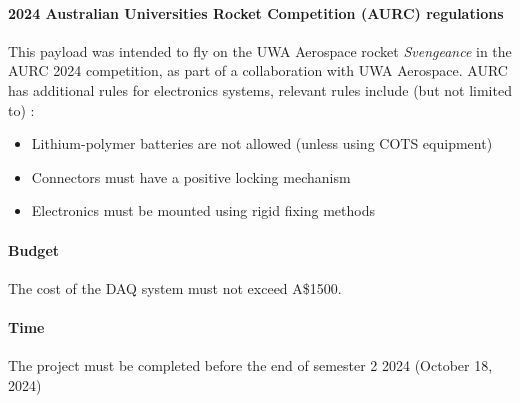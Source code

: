 \documentclass[a4paper,11pt]{article}
\newcommand{\aud}{A\$}
\begin{document}
\paragraph{2024 Australian Universities Rocket Competition (AURC) regulations} This payload was intended to fly on the UWA Aerospace rocket \textit{Svengeance} in the AURC 2024 competition, as part of a collaboration with UWA Aerospace. AURC has additional rules for electronics systems, relevant rules include (but not limited to) \cite{ayaa2023specifications}:
\begin{itemize}
  \item Lithium-polymer batteries are not allowed (unless using COTS equipment)
  \item Connectors must have a positive locking mechanism
  \item Electronics must be mounted using rigid fixing methods
\end{itemize}

\paragraph{Budget} The cost of the DAQ system must not exceed \aud 1500.

\paragraph{Time} The project must be completed before the end of semester 2 2024 (October 18, 2024)
\end{document}
